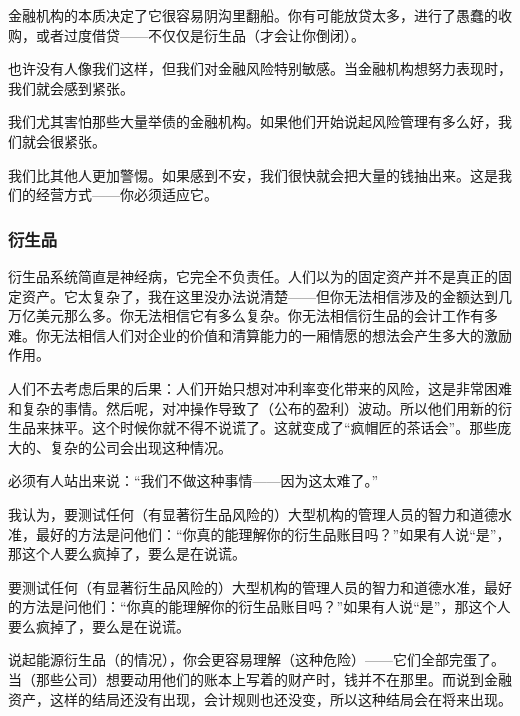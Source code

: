 金融机构的本质决定了它很容易阴沟里翻船。你有可能放贷太多，进行了愚蠢的收购，或者过度借贷——不仅仅是衍生品（才会让你倒闭）。
\par

也许没有人像我们这样，但我们对金融风险特别敏感。当金融机构想努力表现时，我们就会感到紧张。
\par

我们尤其害怕那些大量举债的金融机构。如果他们开始说起风险管理有多么好，我们就会很紧张。
\par

我们比其他人更加警惕。如果感到不安，我们很快就会把大量的钱抽出来。这是我们的经营方式——你必须适应它。
\par

\subsubsection*{衍生品}

衍生品系统简直是神经病，它完全不负责任。人们以为的固定资产并不是真正的固定资产。它太复杂了，我在这里没办法说清楚——但你无法相信涉及的金额达到几万亿美元那么多。你无法相信它有多么复杂。你无法相信衍生品的会计工作有多难。你无法相信人们对企业的价值和清算能力的一厢情愿的想法会产生多大的激励作用。
\par

人们不去考虑后果的后果：人们开始只想对冲利率变化带来的风险，这是非常困难和复杂的事情。然后呢，对冲操作导致了（公布的盈利）波动。所以他们用新的衍生品来抹平。这个时候你就不得不说谎了。这就变成了“疯帽匠的茶话会”。那些庞大的、复杂的公司会出现这种情况。
\par

必须有人站出来说：“我们不做这种事情——因为这太难了。”
\par

我认为，要测试任何（有显著衍生品风险的）大型机构的管理人员的智力和道德水准，最好的方法是问他们：“你真的能理解你的衍生品账目吗？”如果有人说“是”，那这个人要么疯掉了，要么是在说谎。
\par

\begin{WisdomBox}
\par

要测试任何（有显著衍生品风险的）大型机构的管理人员的智力和道德水准，最好的方法是问他们：“你真的能理解你的衍生品账目吗？”如果有人说“是”，那这个人要么疯掉了，要么是在说谎。
\par
\end{WisdomBox}

说起能源衍生品（的情况），你会更容易理解（这种危险）——它们全部完蛋了。当（那些公司）想要动用他们的账本上写着的财产时，钱并不在那里。而说到金融资产，这样的结局还没有出现，会计规则也还没变，所以这种结局会在将来出现。
\par


